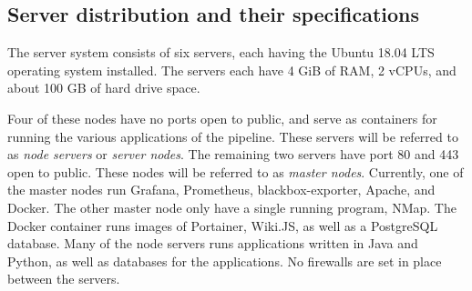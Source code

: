 \subsection{Server distribution and their specifications}
The \knox{} server system consists of six servers, each having the Ubuntu 18.04 LTS operating system installed. The servers each have 4 GiB of RAM, 2 vCPUs, and about 100 GB of hard drive space. 

Four of these nodes have no ports open to public, and serve as containers for running the various applications of the \knox{} pipeline.
These servers will be referred to as \textit{node servers} or \textit{server nodes}. The remaining two servers have port 80 and 443 open to public. These nodes will be referred to as \textit{master nodes}.
Currently, one of the master nodes run Grafana, Prometheus, blackbox-exporter, Apache, and Docker. The other master node only have a single running program, NMap.
The Docker container runs images of Portainer, Wiki.JS, as well as a PostgreSQL database.
Many of the node servers runs applications written in Java and Python, as well as databases for the applications. 
No firewalls are set in place between the servers.

